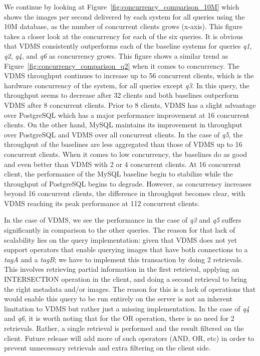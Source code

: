 We continue by looking at Figure~\ref{fig:concurrency_comparison_10M}
which shows the images per second delivered by each system
for all queries using the 10M database, as the number of concurrent
clients grows (x-axis). This figure takes a closer look at the
concurrency for each of the six queries.
It is obvious that VDMS consistently outperforms each of the baseline
systems for queries \textit{q1}, \textit{q2}, \textit{q4},
and \textit{q6} as concurrency grows. This figure
shows a similar trend as Figure~\ref{fig:concurrency_comparison_q2}
when it comes to concurrency.  The
VDMS throughput continues to increase up to 56 concurrent clients, which is
the hardware concurrency of the system, for all queries except \textit{q3}.
In this query, the throughput seems to decrease after 32 clients
and both baselines outperform VDMS after 8 concurrent clients.
Prior to 8 clients, VDMS has a slight advantage over PostgreSQL which has
a major performance improvement at 16 concurrent clients. On the other hand,
MySQL maintains its improvement in throughput over PostgreSQL and VDMS over all
concurrent clients. In the case of \textit{q5}, the throughput of the baselines
are less aggregated than those of VDMS up to 16 concurrent clients. When it comes
to low concurrency, the baselines do as good and even better than VDMS with 2 or
4 concurrent clients.  At 16 concurrent client, the performance of the MySQL baseline
begin to stabilize while the throughput of PostgreSQL begins to degrade. However, as
concurrency increases beyond 16 concurrent clients, the difference
in throughput becomes clear, with VDMS reaching its peak performance at
112 concurrent clients.

In the case of VDMS, we see the performance in the case of \textit{q3}
and \textit{q5} suffers significantly in comparison to the other queries.
The reason for that lack of scalability lies on the query implementation: given that
VDMS does not yet support operators that enable querying images
that have both connections to a \textit{tagA} and a \textit{tagB};
we have to implement this transaction by doing 2 retrievals.
This involves retrieving partial information in the first retrieval,
applying an INTERSECTION operation in the client, and doing a second retrieval
to bring the right metadata and/or images.
The reason for this is a lack of operations that would enable this query to be
run entirely on the server is not an inherent limitation to VDMS but rather
just a missing implementation.
In the case of \textit{q4} and \textit{q6}, it is worth noting
that for the OR operation, there is no need for 2 retrievals.
Rather, a single retrieval is performed and the result filtered on the client.
Future release will add more of such operators (AND, OR, etc) in order to prevent
unnecessary retrievals and extra filtering on the client side.


